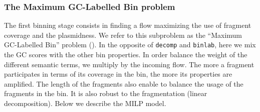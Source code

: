 \subsubsection{The Maximum GC-Labelled Bin problem \MGCLB{}}\label{sec:pbf_iterbin:once:mgclb}

The first binning stage consists in finding a flow maximizing the use of fragment coverage and the plasmidness.
We refer to this subproblem as the \enquote{Maximum GC-Labelled Bin} problem (\MGCLB{}).
In the opposite of \texttt{decomp} and \texttt{binlab}, here we mix the GC scores with the other bin properties.
In order  balance the weight of the different semantic terms, we multiply by the incoming flow.
The more a fragment participates in terms of its coverage in the bin, the more its properties are amplified.
The length of the fragments also enable to balance the usage of the fragments in the bin.
It is also robust to the fragmentation (linear decomposition).
Below we describe the MILP model.

